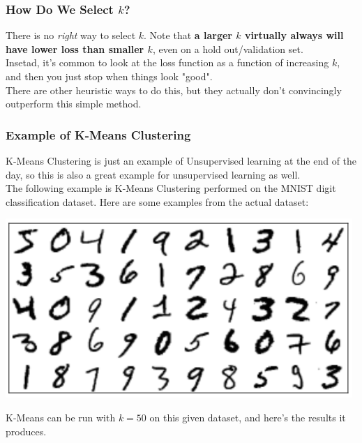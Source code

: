 \documentclass[english, 10pt]{article}
\begin{document}
\subsubsection{How Do We Select $k$?}

There is no \textit{right} way to select $k$. Note that \textbf{a larger $k$ virtually always will have lower loss than smaller $k$}, even on a hold out/validation set.\\

Insetad, it's common to look at the loss function as a function of increasing $k$, and then you just stop when things look "good".\\

There are other heuristic ways to do this, but they actually don't convincingly outperform this simple method.

\subsubsection{Example of K-Means Clustering}

K-Means Clustering is just an example of Unsupervised learning at the end of the day, so this is also a great example for unsupervised learning as well.\\

The following example is K-Means Clustering performed on the MNIST digit classification dataset. Here are some examples from the actual dataset:\\

{
\centering

\includegraphics[scale=0.35]{img/mnistdata.png}

}

\hfill \break K-Means can be run with $k=50$ on this given dataset, and here's the results it produces.\\
\end{document}
